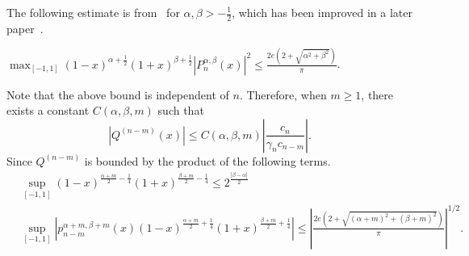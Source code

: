 The following estimate is from~\cite{nevai1994generalized} for $\alpha, \beta > -\frac{1}{2}$, which has been improved in a later paper~\cite{krasikov2005maximum}. 
\begin{theorem}
\label{Thm: 4-Ort-Poly-Der-Est}
    $\max_{[-1,1]} (1-x)^{\alpha+\frac{1}{2}}(1+x)^{\beta+\frac{1}{2}} \left|P^{\alpha,\beta}_n(x)\right|^2 \le \frac{2e (2 + \sqrt{\alpha^2+\beta^2})}{\pi}$. 
\end{theorem}
Note that the above bound is independent of $n$. Therefore, when $m \ge 1$, there exists a constant $C(\alpha, \beta, m)$ such that 
\begin{equation}
    |Q^{(n-m)}(x)| \le  C(\alpha, \beta, m)\left| \frac{c_n}{\gamma_n c_{n-m}} \right|.
\end{equation}
Since $Q^{(n-m)}$ is bounded by the product of the following terms.
\begin{equation*}
\begin{aligned}
    &\sup_{[-1,1]} (1-x)^{\frac{\alpha+m}{2}-\frac{1}{4}} (1+x)^{\frac{\beta+m}{2} - \frac{1}{4}} \le 2^{\frac{|\beta-\alpha|}{2}} \\
    &\sup_{[-1, 1]} \left| p_{n-m}^{\alpha+m, \beta+m}(x) (1 - x)^{\frac{\alpha+m}{2}+\frac{1}{4}} (1+x)^{\frac{\beta+m}{2}+\frac{1}{4}}  \right|\le \left|\frac{2e(2 + \sqrt{ (\alpha+m)^2 + (\beta+m)^2 })}{\pi}\right|^{1/2}.
\end{aligned}
\end{equation*}


